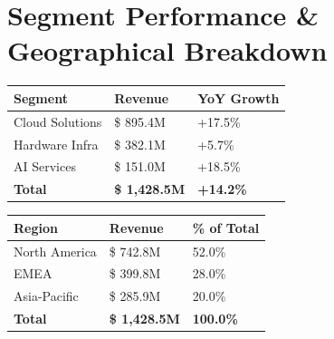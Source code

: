 \documentclass[10pt,a4paper]{article}
\begin{document}
\vspace{6pt}

\section{Segment Performance \& Geographical Breakdown}

\begin{minipage}[t]{0.48\textwidth}
  \begin{tcolorbox}[colback=white, colframe=BrandNavy, title={\bfseries Segment Revenue Distribution (Q3 FY24)}, fonttitle=\small\bfseries, arc=1.5mm]
    \small
    \begin{tabularx}{\textwidth}{Y M M}
      \textbf{Segment} & \textbf{Revenue} & \textbf{YoY Growth} \\
      \hline
      Cloud Solutions & \$ 895.4M & +17.5\% \\
      Hardware Infra & \$ 382.1M & +5.7\% \\
      AI Services & \$ 151.0M & +18.5\% \\
      \hline
      \textbf{Total} & \textbf{\$ 1,428.5M} & \textbf{+14.2\%} \\
    \end{tabularx}
  \end{tcolorbox}
\end{minipage}\hfill
\begin{minipage}[t]{0.48\textwidth}
  \begin{tcolorbox}[colback=white, colframe=BrandBlue, title={\bfseries Geographical Revenue Mix (Q3 FY24)}, fonttitle=\small\bfseries, arc=1.5mm]
    \small
    \begin{tabularx}{\textwidth}{Y M M}
      \textbf{Region} & \textbf{Revenue} & \textbf{\% of Total} \\
      \hline
      North America & \$ 742.8M & 52.0\% \\
      EMEA & \$ 399.8M & 28.0\% \\
      Asia-Pacific & \$ 285.9M & 20.0\% \\
      \hline
      \textbf{Total} & \textbf{\$ 1,428.5M} & \textbf{100.0\%} \\
    \end{tabularx}
  \end{tcolorbox}
\end{minipage}

\clearpage

\end{document}
